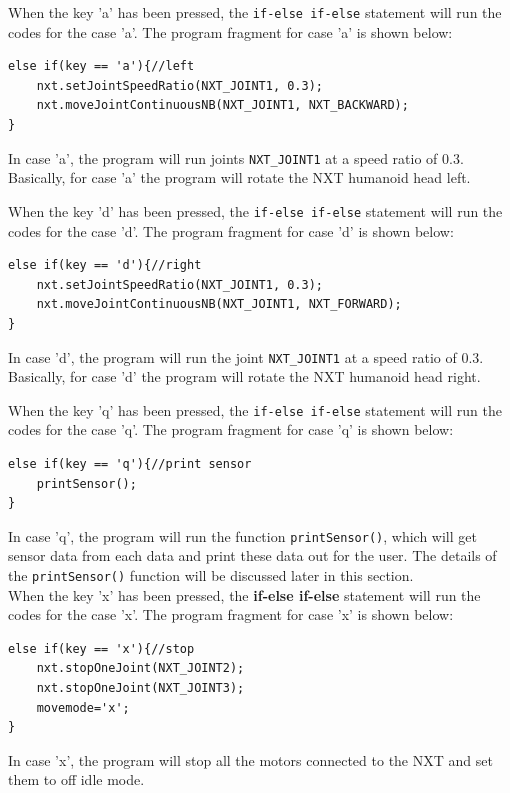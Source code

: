 \documentclass[11pt]{article}
\begin{document}
When the key 'a' has been pressed, the \verb+if-else if-else+ statement will run the codes for the case 'a'.
The program fragment for case 'a' is shown below:
\begin{lstlisting}
else if(key == 'a'){//left
    nxt.setJointSpeedRatio(NXT_JOINT1, 0.3);
    nxt.moveJointContinuousNB(NXT_JOINT1, NXT_BACKWARD);
}
\end{lstlisting}
In case 'a', the program will run joints \verb+NXT_JOINT1+ at a speed ratio of 0.3.
Basically, for case 'a' the program will rotate the NXT humanoid head left.\\
\newline

When the key 'd' has been pressed, the \verb+if-else if-else+ statement will run the codes for the case 'd'.
The program fragment for case 'd' is shown below:
\begin{lstlisting}
else if(key == 'd'){//right
    nxt.setJointSpeedRatio(NXT_JOINT1, 0.3);
    nxt.moveJointContinuousNB(NXT_JOINT1, NXT_FORWARD);
}
\end{lstlisting}

In case 'd', the program will run the joint \verb+NXT_JOINT1+ at a speed ratio of 0.3.
Basically, for case 'd' the program will rotate the NXT humanoid head right.\\
\newline

When the key 'q' has been pressed, the \verb+if-else if-else+ statement will run the codes for the case 'q'.
The program fragment for case 'q' is shown below:
\begin{lstlisting}
else if(key == 'q'){//print sensor
    printSensor();
}
\end{lstlisting}
In case 'q', the program will run the function {\tt printSensor()}, which will 
get sensor data from each data and print these data out for the user. The details 
of the {\tt printSensor()} function will be discussed later in this section.\\

When the key 'x' has been pressed, the {\bf if-else if-else} statement will run 
the codes for the case 'x'. The program fragment for case 'x' is shown below:
\begin{lstlisting}
else if(key == 'x'){//stop
    nxt.stopOneJoint(NXT_JOINT2);
    nxt.stopOneJoint(NXT_JOINT3);
    movemode='x';
}
\end{lstlisting}
In case 'x', the program will stop all the motors connected to the NXT and set 
them to off idle mode.
\end{document}
